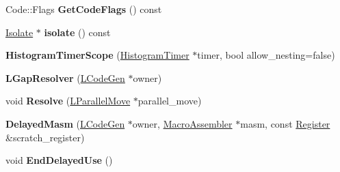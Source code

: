 \begin{DoxyCompactItemize}
\item 
Code\+::\+Flags {\bfseries Get\+Code\+Flags} () const \hypertarget{classv8_1_1internal_1_1_b_a_s_e___e_m_b_e_d_d_e_d_a639e3ef67cb841986574eec0da6ac5cd}{}\label{classv8_1_1internal_1_1_b_a_s_e___e_m_b_e_d_d_e_d_a639e3ef67cb841986574eec0da6ac5cd}

\item 
\hyperlink{classv8_1_1internal_1_1_isolate}{Isolate} $\ast$ {\bfseries isolate} () const \hypertarget{classv8_1_1internal_1_1_b_a_s_e___e_m_b_e_d_d_e_d_a8fd23ecb465f23cd3c60deb9a7bde1f8}{}\label{classv8_1_1internal_1_1_b_a_s_e___e_m_b_e_d_d_e_d_a8fd23ecb465f23cd3c60deb9a7bde1f8}

\item 
{\bfseries Histogram\+Timer\+Scope} (\hyperlink{classv8_1_1internal_1_1_histogram_timer}{Histogram\+Timer} $\ast$timer, bool allow\+\_\+nesting=false)\hypertarget{classv8_1_1internal_1_1_b_a_s_e___e_m_b_e_d_d_e_d_ad3dc89f112f444675854841998099835}{}\label{classv8_1_1internal_1_1_b_a_s_e___e_m_b_e_d_d_e_d_ad3dc89f112f444675854841998099835}

\item 
{\bfseries L\+Gap\+Resolver} (\hyperlink{classv8_1_1internal_1_1_l_code_gen}{L\+Code\+Gen} $\ast$owner)\hypertarget{classv8_1_1internal_1_1_b_a_s_e___e_m_b_e_d_d_e_d_a0b23d339700f93d3affcf5f4f550d22b}{}\label{classv8_1_1internal_1_1_b_a_s_e___e_m_b_e_d_d_e_d_a0b23d339700f93d3affcf5f4f550d22b}

\item 
void {\bfseries Resolve} (\hyperlink{classv8_1_1internal_1_1_l_parallel_move}{L\+Parallel\+Move} $\ast$parallel\+\_\+move)\hypertarget{classv8_1_1internal_1_1_b_a_s_e___e_m_b_e_d_d_e_d_aa098bed4ffadf485fd317ccb5fe499e0}{}\label{classv8_1_1internal_1_1_b_a_s_e___e_m_b_e_d_d_e_d_aa098bed4ffadf485fd317ccb5fe499e0}

\item 
{\bfseries Delayed\+Masm} (\hyperlink{classv8_1_1internal_1_1_l_code_gen}{L\+Code\+Gen} $\ast$owner, \hyperlink{classv8_1_1internal_1_1_macro_assembler}{Macro\+Assembler} $\ast$masm, const \hyperlink{structv8_1_1internal_1_1_register}{Register} \&scratch\+\_\+register)\hypertarget{classv8_1_1internal_1_1_b_a_s_e___e_m_b_e_d_d_e_d_a312aa51403d7b6d97fae95795433c50b}{}\label{classv8_1_1internal_1_1_b_a_s_e___e_m_b_e_d_d_e_d_a312aa51403d7b6d97fae95795433c50b}

\item 
void {\bfseries End\+Delayed\+Use} ()\hypertarget{classv8_1_1internal_1_1_b_a_s_e___e_m_b_e_d_d_e_d_a0c8e035b617c4144d25f1097a57cd136}{}\label{classv8_1_1internal_1_1_b_a_s_e___e_m_b_e_d_d_e_d_a0c8e035b617c4144d25f1097a57cd136}


\end{DoxyCompactItemize}

